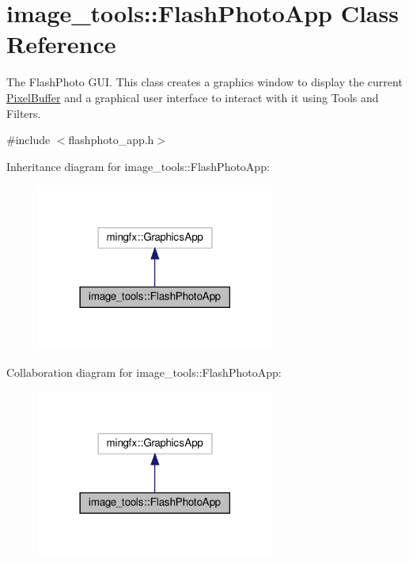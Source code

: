 \hypertarget{classimage__tools_1_1FlashPhotoApp}{}\section{image\+\_\+tools\+:\+:Flash\+Photo\+App Class Reference}
\label{classimage__tools_1_1FlashPhotoApp}


The Flash\+Photo G\+UI. This class creates a graphics window to display the current \hyperlink{classimage__tools_1_1PixelBuffer}{Pixel\+Buffer} and a graphical user interface to interact with it using Tools and Filters.  




{\ttfamily \#include $<$flashphoto\+\_\+app.\+h$>$}



Inheritance diagram for image\+\_\+tools\+:\+:Flash\+Photo\+App\+:
\nopagebreak
\begin{figure}[H]
\begin{center}
\leavevmode
\includegraphics[width=222pt]{classimage__tools_1_1FlashPhotoApp__inherit__graph}
\end{center}
\end{figure}


Collaboration diagram for image\+\_\+tools\+:\+:Flash\+Photo\+App\+:
\nopagebreak
\begin{figure}[H]
\begin{center}
\leavevmode
\includegraphics[width=222pt]{classimage__tools_1_1FlashPhotoApp__coll__graph}
\end{center}
\end{figure}
